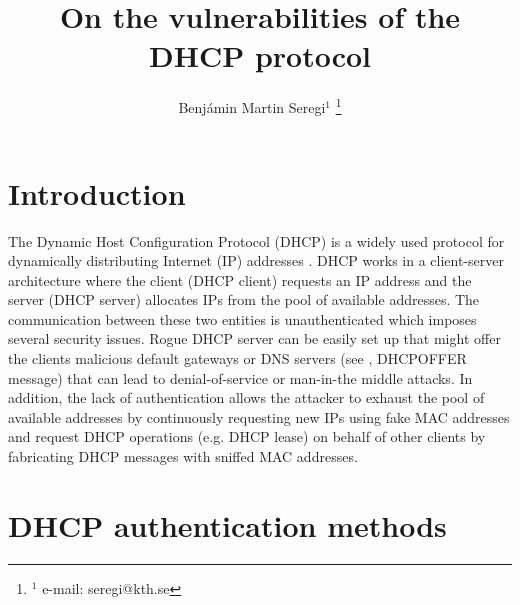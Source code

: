 \documentclass[letterpaper, 10 pt, conference]{ieeeconf}  %
\title{\LARGE \bf
On the vulnerabilities of the DHCP protocol
}
\author{Benjámin Martin Seregi$^{1}$%
\thanks{$^{1}$ e-mail: seregi@kth.se}%
}
\begin{document}
\maketitle
\thispagestyle{fancy}
\fancyhf{}

\begin{abstract}

\end{abstract}


\section{Introduction}
The Dynamic Host Configuration Protocol (DHCP) is a widely used protocol for dynamically distributing Internet (IP) addresses \cite{dhcprfc}. DHCP works in a client-server architecture where the client (DHCP client) requests an IP address and the server (DHCP server) allocates IPs from the pool of available addresses. The communication between these two entities is unauthenticated which imposes several security issues. Rogue DHCP server can be easily set up that might offer the clients malicious default gateways or DNS servers (see \cite{dhcprfc}, DHCPOFFER message) that can lead to denial-of-service or man-in-the middle attacks. In addition, the lack of authentication allows the attacker to exhaust the pool of available addresses by continuously requesting new IPs using fake MAC addresses and request DHCP operations (e.g. DHCP lease) on behalf of other clients by fabricating DHCP messages with sniffed MAC addresses.

\section{DHCP authentication methods}



\addtolength{\textheight}{-12cm}   %




\end{document}
